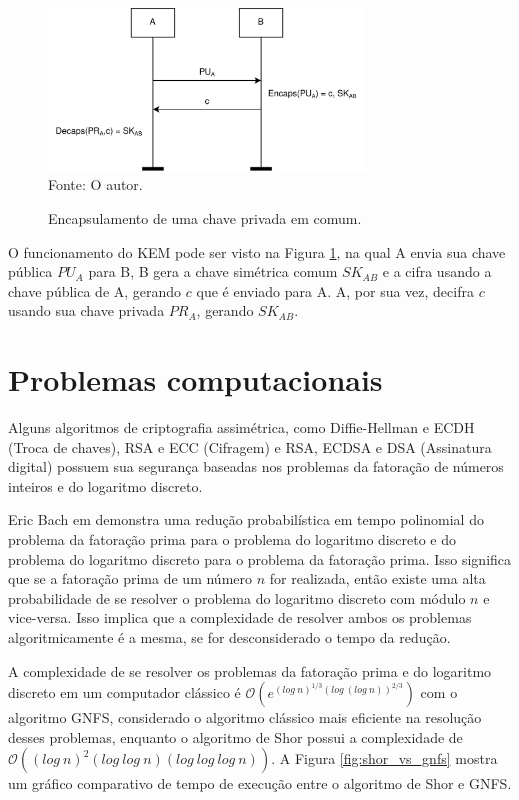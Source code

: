     \begin{figure}[htb!]
        \centering
        \caption{Encapsulamento de uma chave privada em comum.}
        \includegraphics[width=0.75\textwidth]{Figuras/kem.png}\\
        \footnotesize{Fonte: O autor.}
        \label{fig:kem}
    \end{figure}

    O funcionamento do \ac{KEM} pode ser visto na Figura \ref{fig:kem}, na qual A envia sua chave pública $PU_A$ para B, B gera a chave simétrica comum $SK_{AB}$ e a cifra usando a chave pública de A, gerando $c$ que é enviado para A. A, por sua vez, decifra $c$ usando sua chave privada $PR_A$, gerando $SK_{AB}$. 
    
\section{Problemas computacionais}
\label{sec:problemas_computacionais}
    Alguns algoritmos de criptografia assimétrica, como Diffie-Hellman e \ac{ECDH} (Troca de chaves), RSA e \ac{ECC} (Cifragem) e RSA, \ac{ECDSA} e \ac{DSA} (Assinatura digital) possuem sua segurança baseadas nos problemas da fatoração de números inteiros e do logaritmo discreto.

    Eric Bach em \cite{discrete_logarithms_and_factoring_reductions} demonstra uma redução probabilística em tempo polinomial do problema da fatoração prima para o problema do logaritmo discreto e do problema do logaritmo discreto para o problema da fatoração prima. Isso significa que se a fatoração prima de um número $n$ for realizada, então existe uma alta probabilidade de se resolver o problema do logaritmo discreto com módulo $n$ e vice-versa. Isso implica que a complexidade de resolver ambos os problemas algoritmicamente é a mesma, se for desconsiderado o tempo da redução.
    
    A complexidade de se resolver os problemas da fatoração prima e do logaritmo discreto em um computador clássico é $\mathcal{O}(e^{(log\ n)^{1/3}(log\ (log\ n))^{2/3}})$ com o algoritmo \ac{GNFS}, considerado o algoritmo clássico mais eficiente na resolução desses problemas, enquanto o algoritmo de Shor possui a complexidade de $\mathcal{O}((log\ n)^{2}(log\ log\ n)(log\ log\ log\ n))$\cite{shor_vs_gnfs}. A Figura \ref{fig:shor_vs_gnfs} mostra um gráfico comparativo de tempo de execução entre o algoritmo de Shor e \ac{GNFS}.


